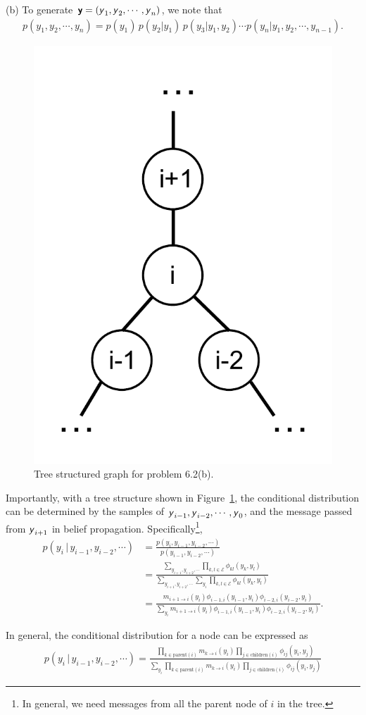 \documentclass{article}
\newcommand{\s}[1]{\textsf{\textit{#1}}}
\newcommand{\bs}[1]{\textsf{\textbf{#1}}}
\begin{document}
\noindent
(b) To generate $\bs{y} = (\s{y}_1, \s{y}_2, \cdots, \s{y}_n)$, we note that
\begin{align*}
	p(y_1, y_2, \cdots, y_n) = p(y_1)\, p (y_2 | y_1)\, p(y_3 | y_1, y_2) \cdots p(y_n | y_1, y_2, \cdots, y_{n-1}).
\end{align*}
%
\begin{figure}[h!]
  \centering
  \vspace{-0.3cm}
  \includegraphics[width=0.2\columnwidth]{62b.pdf}
    \vspace{-0.1cm}
  \caption{Tree structured graph for problem 6.2(b).}
  \label{f:62b}
\end{figure}
%

Importantly, with a tree structure shown in Figure~\ref{f:62b}, the conditional
distribution can be determined by the samples of
$\s{y}_{i-1}, \s{y}_{i-2}, \cdots, \s{y}_{0}$, and the message passed from $\s{y}_{i+1}$
in belief propagation. Specifically\footnote{In general, we need messages from all the parent node of $i$ in the tree.},
%
\begin{align*}
	p(y_i \,\big|\, y_{i-1}, y_{i-2}, \cdots) &= \frac{p(y_i, y_{i-1}, y_{i-2}, \cdots)}{p(y_{i-1}, y_{i-2}, \cdots)}\\
	&=\frac{\sum_{y_{i+1}, y_{i+2}, \cdots} \prod_{k, l \in \mathscr{E}} \phi_{kl}(y_k, y_l)}{\sum_{y_{i+1}, y_{i+2}, \cdots}\sum_{y_{i}}\prod_{k, l \in \mathscr{E}}\phi_{kl}(y_k, y_l)} \\ 
	&= \frac{m_{i+1\to i}(y_i) \phi_{i-1, i}(y_{i-1}, y_i)\phi_{i-2, i}(y_{i-2}, y_i)}{\sum_{y_{i}}m_{i+1\to i}(y_i) \phi_{i-1, i}(y_{i-1}, y_i)\phi_{i-2, i}(y_{i-2}, y_i)}.
\end{align*}
%

In general, the conditional distribution for a node can be expressed as
\begin{align}
	p(y_i \,\big|\, y_{i-1}, y_{i-2}, \cdots) = \frac{\prod_{k \in \text{parent}(i)}m_{k\to i}(y_i)\prod_{j \in \text{children}(i)}\phi_{ij}(y_i, y_j)}{\sum_{y_{i}}\prod_{k \in \text{parent}(i)}m_{k\to i}(y_i)\prod_{j \in \text{children}(i)}\phi_{ij}(y_i, y_j)} \label{eq:62_conditional_dist}
\end{align}
\end{document}
